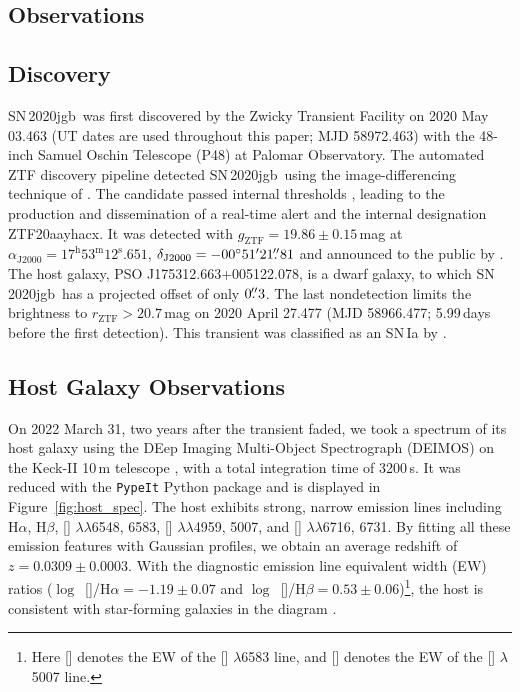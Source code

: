 \documentclass[twocolumn]{aastex631}
\newcommand{\sn}{SN\,2020jgb}
\begin{document}
\begin{CJK*}{UTF8}{gbsn}
\section{Observations} \label{sec:obs}
\subsection{Discovery}

\sn\ was first discovered by the Zwicky Transient Facility \citep[ZTF;][]{Bellm_ZTF_2019a,Graham_ZTF_2019, Dekany_ZTF_2020} on 2020 May 03.463 (UT dates are used throughout this paper; MJD 58972.463) with the 48-inch Samuel Oschin Telescope (P48) at Palomar Observatory. The automated ZTF discovery pipeline \citep{Masci_ZTF_2019} detected \sn\ using the image-differencing technique of \citet{Zackay_imagesub_2016}. The candidate passed internal thresholds \citep[e.g.,][]{Mahabal_ZTFML_2019, Duev_ZTFML_2019}, leading to the production and dissemination of a real-time alert \citep{Patterson_ZTFalert_2019} and the internal designation ZTF20aayhacx. It was detected with $g_\mathrm{ZTF} = 19.86 \pm 0.15\,$mag at $\alpha_\mathrm{J2000}=17^\mathrm{h}53^\mathrm{m}12^\mathrm{s}.651$, $\delta_\mathrm{J2000}=-00^\circ51'21\mbox{$.\!\!^{\prime\prime}$}{81}$ and announced to the public by \citet{Fremling_report_2020}. The host galaxy, PSO J175312.663+005122.078, is a dwarf galaxy, to which \sn\ has a projected offset of only $0\mbox{$.\!\!^{\prime\prime}$}3$. The last nondetection limits the brightness to $r_\mathrm{ZTF} > 20.7$\,mag on 2020 April 27.477 (MJD 58966.477; 5.99\,days before the first detection). This transient was classified as an SN\,Ia by \citet{TNS_2020}.

\subsection{Host Galaxy Observations}
On 2022 March 31, two years after the transient faded, we took a spectrum of its host galaxy using the DEep Imaging Multi-Object Spectrograph (DEIMOS) on the Keck-II 10\,m telescope \citep{DEIMOS_2003}, with a total integration time of 3200\,s. It was reduced with the \texttt{PypeIt} Python package \citep{pypeit:joss_pub} and is displayed in Figure~\ref{fig:host_spec}. 
The host exhibits strong, narrow emission lines including H$\alpha$, H$\beta$, [] $\lambda\lambda$6548, 6583, [] $\lambda\lambda$4959, 5007, and [] $\lambda\lambda$6716, 6731. By fitting all these emission features with Gaussian profiles, we obtain an average redshift of $z=0.0309\pm0.0003$. With the diagnostic emission line equivalent width (EW) ratios ($\log$~[]/H$\alpha=-1.19\pm0.07$ and $\log$~[]/H$\beta=0.53\pm0.06$)\footnote{Here [] denotes the EW of the [] $\lambda$6583 line, and [] denotes the EW of the [] $\lambda$5007 line.}, the host is consistent with star-forming galaxies in the \citet[][hereafter BPT]{BPT_1981} diagram \citep[see also][]{Veilleux_1987}. 


\end{CJK*}
\end{document}
